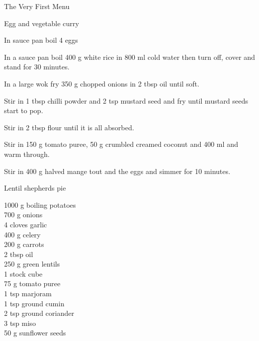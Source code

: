 \begin{menu}{The Very First Menu}
\begin{recipe}{2}{Egg and vegetable curry}
\begin{ingredients}
		\end{ingredients}
	
    \begin{instructions}
    \item 
        In sauce pan boil
        4   eggs\item 
      In a
      sauce pan
      boil
      400 g  white rice
      in
      800 ml  cold water
      then turn off, cover and stand for 30 minutes.
    \item 
        In a large wok fry
        350 g chopped onions
        in
        2 tbsp  oil
        until soft.
      \item 
        Stir in 1 tbsp  chilli powder
        and
        2 tsp  mustard seed
        and fry until mustard seeds start to pop.
      \item 
        Stir in
        2 tbsp  flour
        until it is all absorbed.
      \item 
        Stir in
        150 g  tomato puree,
        50 g crumbled creamed coconut
        and
        400 ml  
        and warm through.
      \item 
        Stir in
        400 g halved mange tout
        and the eggs
        and simmer for 10 minutes.
      
    \end{instructions}
    \end{recipe}%
  
    \begin{recipe}{2}{Lentil shepherds pie}%
    
	
		\begin{ingredients}
		1000 g boiling potatoes  \\
	700 g onions  \\
	4 cloves garlic  \\
	400 g celery  \\
	200 g carrots  \\
	2 tbsp oil  \\
	250 g green lentils  \\
	1  stock cube  \\
	75 g tomato puree  \\
	1 tsp marjoram  \\
	1 tsp ground cumin  \\
	2 tsp ground coriander  \\
	3 tsp miso  \\
	50 g sunflower seeds  \\
	

\end{ingredients}
\end{recipe}
\end{menu}
